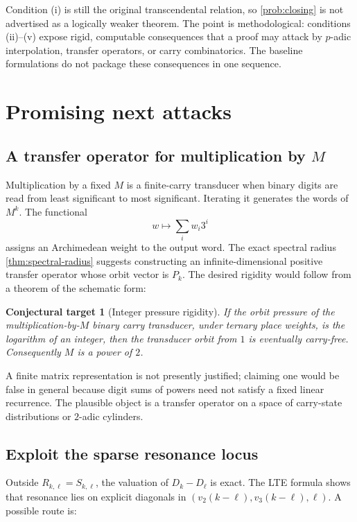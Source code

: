 \documentclass[11pt]{article}
\newtheorem{conjecture}[theorem]{Conjectural target}
\theoremstyle{definition}
\theoremstyle{remark}
\newcommand{\vTwo}{v_2}
\newcommand{\vThree}{v_3}
\begin{document}
Condition (i) is still the original transcendental relation, so
\cref{prob:closing} is not advertised as a logically weaker theorem.  The
point is methodological: conditions (ii)--(v) expose rigid, computable
consequences that a proof may attack by $p$-adic interpolation, transfer
operators, or carry combinatorics.  The baseline formulations do not package
these consequences in one sequence.

\section{Promising next attacks}

\subsection{A transfer operator for multiplication by $M$}

Multiplication by a fixed $M$ is a finite-carry transducer when binary digits
are read from least significant to most significant.  Iterating it generates
the words of $M^k$.  The functional
\[
  w\longmapsto\sum_i w_i3^i
\]
assigns an Archimedean weight to the output word.  The exact spectral radius
\cref{thm:spectral-radius} suggests constructing an infinite-dimensional
positive transfer operator whose orbit vector is $P_k$.  The desired rigidity
would follow from a theorem of the schematic form:

\begin{conjecture}[Integer pressure rigidity]\label{conj:pressure}
If the orbit pressure of the multiplication-by-$M$ binary carry transducer,
under ternary place weights, is the logarithm of an integer, then the
transducer orbit from $1$ is eventually carry-free.  Consequently $M$ is a
power of $2$.
\end{conjecture}

A finite matrix representation is not presently justified; claiming one
would be false in general because digit sums of powers need not satisfy a
fixed linear recurrence.  The plausible object is a transfer operator on a
space of carry-state distributions or $2$-adic cylinders.

\subsection{Exploit the sparse resonance locus}

Outside $R_{k,\ell}=S_{k,\ell}$, the valuation of $D_k-D_\ell$ is exact.  The
LTE formula shows that resonance lies on explicit diagonals in
$(\vTwo(k-\ell),\vThree(k-\ell),\ell)$.  A possible route is:
\end{document}
